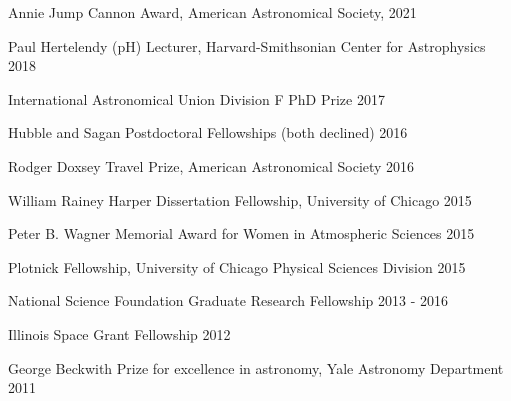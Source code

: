 \documentclass[12pt,letterpaper]{article}
\begin{document}
\begin{list}{}{\cvlist}
    \item Annie Jump Cannon Award, American Astronomical Society, \hfill 2021
    \item Paul Hertelendy (pH) Lecturer, Harvard-Smithsonian Center for Astrophysics \hfill 2018 
    \item International Astronomical Union Division F PhD Prize \hfill 2017
    \item Hubble and Sagan Postdoctoral Fellowships (both declined) \hfill 2016
    \item Rodger Doxsey Travel Prize, American Astronomical Society \hfill 2016
    \item William Rainey Harper Dissertation Fellowship, University of Chicago \hfill 2015
    \item Peter B. Wagner Memorial Award for Women in Atmospheric Sciences \hfill 2015
    \item Plotnick Fellowship, University of Chicago Physical Sciences Division \hfill 2015
    \item National Science Foundation Graduate Research Fellowship \hfill 2013 - 2016
    \item Illinois Space Grant Fellowship \hfill 2012
    \item George Beckwith Prize for excellence in astronomy, Yale Astronomy Department \hfill2011
\end{list}

\end{document}
